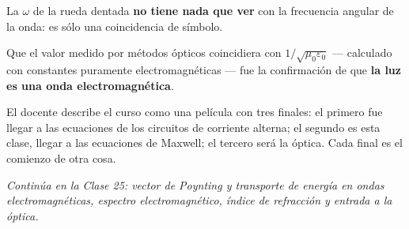 \documentclass[12pt,a4paper]{article}
\begin{document}


\begin{warnbox}
La $\omega$ de la rueda dentada \textbf{no tiene nada que ver} con la
frecuencia angular de la onda: es sólo una coincidencia de símbolo.
\end{warnbox}

Que el valor medido por métodos ópticos coincidiera con
$1/\sqrt{\mu_0\varepsilon_0}$ --- calculado con constantes puramente
electromagnéticas --- fue la confirmación de que \textbf{la luz es una onda
electromagnética}.

\begin{notebox}
El docente describe el curso como una película con tres finales: el primero
fue llegar a las ecuaciones de los circuitos de corriente alterna; el segundo
es esta clase, llegar a las ecuaciones de Maxwell; el tercero será la óptica.
Cada final es el comienzo de otra cosa.
\end{notebox}

\vspace{1em}
\noindent\emph{Continúa en la Clase 25: vector de Poynting y transporte de
energía en ondas electromagnéticas, espectro electromagnético, índice de
refracción y entrada a la óptica.}
\end{document}
